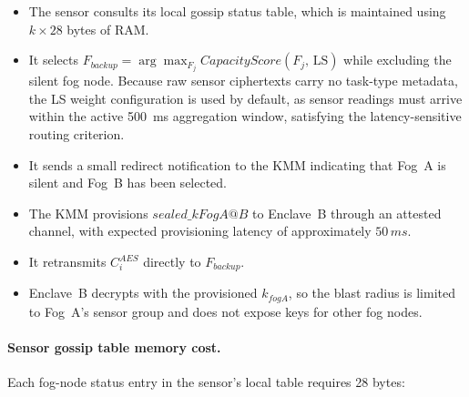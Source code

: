 \documentclass[conference]{IEEEtran}
\begin{document}
    \begin{itemize}
        \item The sensor consults its local gossip status table, which is maintained using $k\times 28$ bytes of RAM.
        \item It selects $F_{backup}=\arg\max_{F_j} CapacityScore(F_j,\,\text{LS})$ while excluding the silent fog node. Because raw sensor ciphertexts carry no task-type metadata, the LS weight configuration is used by default, as sensor readings must arrive within the active 500~ms aggregation window, satisfying the latency-sensitive routing criterion.
        \item It sends a small redirect notification to the KMM indicating that Fog~A is silent and Fog~B has been selected.
        \item The KMM provisions $sealed\_kFogA@B$ to Enclave~B through an attested channel, with expected provisioning latency of approximately $50\,ms$.
        \item It retransmits $C_i^{AES}$ directly to $F_{backup}$.
        \item Enclave~B decrypts with the provisioned $k_{fogA}$, so the blast radius is limited to Fog~A's sensor group and does not expose keys for other fog nodes.
    \end{itemize}

    \paragraph{Sensor gossip table memory cost.}
    Each fog-node status entry in the sensor's local table requires 28 bytes:

    \begin{table}[htbp]
    \caption{Sensor-Side Gossip Status Entry}
    \label{table:sensor-gossip-entry}
    \centering
    \end{table}
\end{document}
